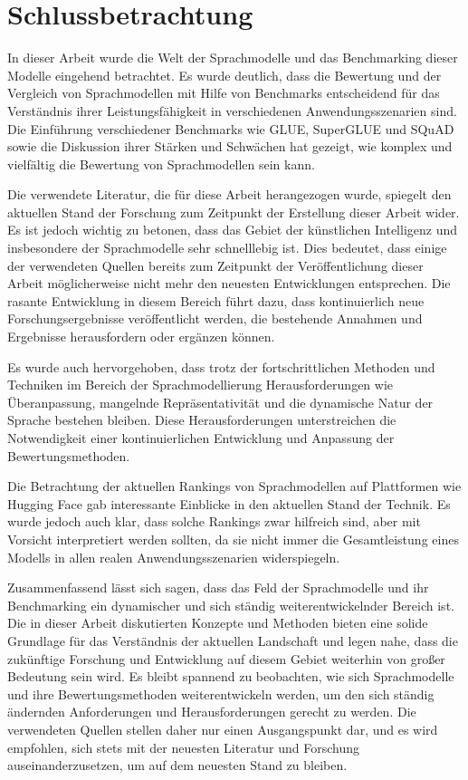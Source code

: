 \section{Schlussbetrachtung} \label{sec:schlussbetrachtung}
In dieser Arbeit wurde die Welt der Sprachmodelle und das Benchmarking dieser Modelle eingehend betrachtet.
Es wurde deutlich, dass die Bewertung und der Vergleich von Sprachmodellen mit Hilfe von Benchmarks entscheidend für das Verständnis ihrer Leistungsfähigkeit in verschiedenen Anwendungsszenarien sind. 
Die Einführung verschiedener Benchmarks wie GLUE, SuperGLUE und SQuAD sowie die Diskussion ihrer Stärken und Schwächen hat gezeigt, wie komplex und vielfältig die Bewertung von Sprachmodellen sein kann.

Die verwendete Literatur, die für diese Arbeit herangezogen wurde, spiegelt den aktuellen Stand der Forschung zum Zeitpunkt der Erstellung dieser Arbeit wider. 
Es ist jedoch wichtig zu betonen, dass das Gebiet der künstlichen Intelligenz und insbesondere der Sprachmodelle sehr schnelllebig ist. 
Dies bedeutet, dass einige der verwendeten Quellen bereits zum Zeitpunkt der Veröffentlichung dieser Arbeit möglicherweise nicht mehr den neuesten Entwicklungen entsprechen. 
Die rasante Entwicklung in diesem Bereich führt dazu, dass kontinuierlich neue Forschungsergebnisse veröffentlicht werden, die bestehende Annahmen und Ergebnisse herausfordern oder ergänzen können.

Es wurde auch hervorgehoben, dass trotz der fortschrittlichen Methoden und Techniken im Bereich der Sprachmodellierung Herausforderungen wie Überanpassung, mangelnde Repräsentativität und die dynamische Natur der Sprache bestehen bleiben. 
Diese Herausforderungen unterstreichen die Notwendigkeit einer kontinuierlichen Entwicklung und Anpassung der Bewertungsmethoden.

Die Betrachtung der aktuellen Rankings von Sprachmodellen auf Plattformen wie Hugging Face gab interessante Einblicke in den aktuellen Stand der Technik. Es wurde jedoch auch klar, dass solche Rankings zwar hilfreich sind, aber mit Vorsicht interpretiert werden sollten, da sie nicht immer die Gesamtleistung eines Modells in allen realen Anwendungsszenarien widerspiegeln.

Zusammenfassend lässt sich sagen, dass das Feld der Sprachmodelle und ihr Benchmarking ein dynamischer und sich ständig weiterentwickelnder Bereich ist. 
Die in dieser Arbeit diskutierten Konzepte und Methoden bieten eine solide Grundlage für das Verständnis der aktuellen Landschaft und legen nahe, dass die zukünftige Forschung und Entwicklung auf diesem Gebiet weiterhin von großer Bedeutung sein wird. 
Es bleibt spannend zu beobachten, wie sich Sprachmodelle und ihre Bewertungsmethoden weiterentwickeln werden, um den sich ständig ändernden Anforderungen und Herausforderungen gerecht zu werden. 
Die verwendeten Quellen stellen daher nur einen Ausgangspunkt dar, und es wird empfohlen, sich stets mit der neuesten Literatur und Forschung auseinanderzusetzen, um auf dem neuesten Stand zu bleiben.